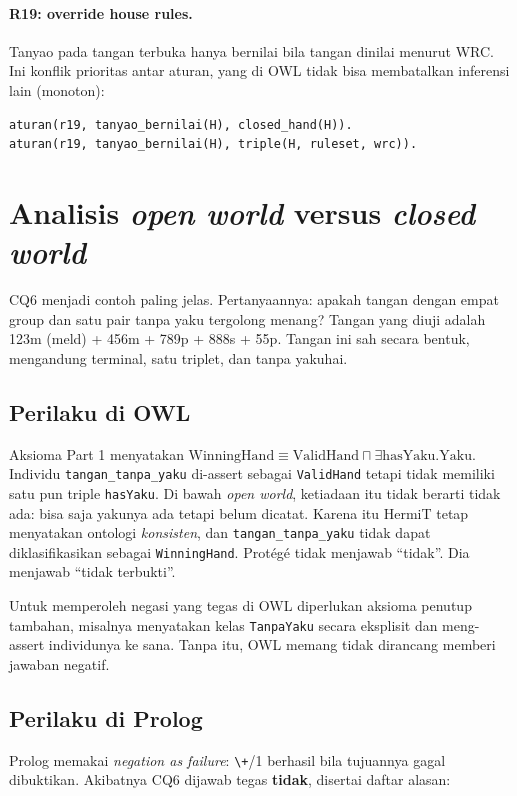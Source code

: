 \documentclass[11pt,a4paper]{article}
\newcommand{\code}[1]{\texttt{#1}}
\begin{document}
\paragraph{R19: override house rules.}
Tanyao pada tangan terbuka hanya bernilai bila tangan dinilai menurut WRC. Ini konflik
prioritas antar aturan, yang di OWL tidak bisa membatalkan inferensi lain (monoton):
\begin{lstlisting}
aturan(r19, tanyao_bernilai(H), closed_hand(H)).
aturan(r19, tanyao_bernilai(H), triple(H, ruleset, wrc)).
\end{lstlisting}

\section{Analisis \textit{open world} versus \textit{closed world}}
\label{sec:ocwa}

CQ6 menjadi contoh paling jelas. Pertanyaannya: apakah tangan dengan empat group dan satu
pair tanpa yaku tergolong menang? Tangan yang diuji adalah 123m (meld) + 456m + 789p +
888s + 55p. Tangan ini sah secara bentuk, mengandung terminal, satu triplet, dan tanpa yakuhai.

\subsection{Perilaku di OWL}

Aksioma Part 1 menyatakan
$\text{WinningHand} \equiv \text{ValidHand} \sqcap \exists\text{hasYaku}.\text{Yaku}$.
Individu \code{tangan_tanpa_yaku} di-assert sebagai \code{ValidHand} tetapi tidak memiliki
satu pun triple \code{hasYaku}. Di bawah \textit{open world}, ketiadaan itu tidak berarti
tidak ada: bisa saja yakunya ada tetapi belum dicatat. Karena itu HermiT tetap menyatakan
ontologi \emph{konsisten}, dan \code{tangan_tanpa_yaku} tidak dapat diklasifikasikan
sebagai \code{WinningHand}. Protégé tidak menjawab ``tidak''. Dia menjawab ``tidak terbukti''.

Untuk memperoleh negasi yang tegas di OWL diperlukan aksioma penutup tambahan, misalnya
menyatakan kelas \code{TanpaYaku} secara eksplisit dan meng-assert individunya ke sana.
Tanpa itu, OWL memang tidak dirancang memberi jawaban negatif.

\subsection{Perilaku di Prolog}

Prolog memakai \textit{negation as failure}: \code{\textbackslash+}/1 berhasil bila tujuannya
gagal dibuktikan. Akibatnya CQ6 dijawab tegas \textbf{tidak}, disertai daftar alasan:
\end{document}
